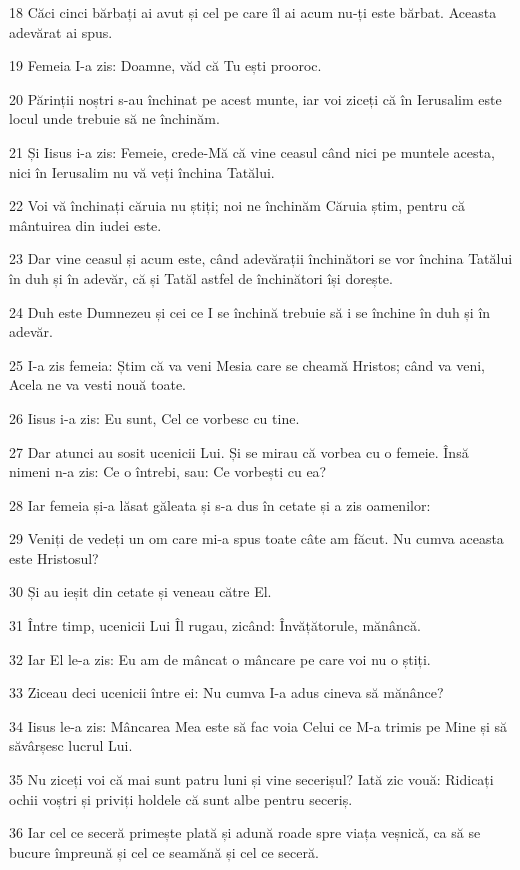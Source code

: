 \par 18 Căci cinci bărbați ai avut și cel pe care îl ai acum nu-ți este bărbat. Aceasta adevărat ai spus.
\par 19 Femeia I-a zis: Doamne, văd că Tu ești prooroc.
\par 20 Părinții noștri s-au închinat pe acest munte, iar voi ziceți că în Ierusalim este locul unde trebuie să ne închinăm.
\par 21 Și Iisus i-a zis: Femeie, crede-Mă că vine ceasul când nici pe muntele acesta, nici în Ierusalim nu vă veți închina Tatălui.
\par 22 Voi vă închinați căruia nu știți; noi ne închinăm Căruia știm, pentru că mântuirea din iudei este.
\par 23 Dar vine ceasul și acum este, când adevărații închinători se vor închina Tatălui în duh și în adevăr, că și Tatăl astfel de închinători își dorește.
\par 24 Duh este Dumnezeu și cei ce I se închină trebuie să i se închine în duh și în adevăr.
\par 25 I-a zis femeia: Știm că va veni Mesia care se cheamă Hristos; când va veni, Acela ne va vesti nouă toate.
\par 26 Iisus i-a zis: Eu sunt, Cel ce vorbesc cu tine.
\par 27 Dar atunci au sosit ucenicii Lui. Și se mirau că vorbea cu o femeie. Însă nimeni n-a zis: Ce o întrebi, sau: Ce vorbești cu ea?
\par 28 Iar femeia și-a lăsat găleata și s-a dus în cetate și a zis oamenilor:
\par 29 Veniți de vedeți un om care mi-a spus toate câte am făcut. Nu cumva aceasta este Hristosul?
\par 30 Și au ieșit din cetate și veneau către El.
\par 31 Între timp, ucenicii Lui Îl rugau, zicând: Învățătorule, mănâncă.
\par 32 Iar El le-a zis: Eu am de mâncat o mâncare pe care voi nu o știți.
\par 33 Ziceau deci ucenicii între ei: Nu cumva I-a adus cineva să mănânce?
\par 34 Iisus le-a zis: Mâncarea Mea este să fac voia Celui ce M-a trimis pe Mine și să săvârșesc lucrul Lui.
\par 35 Nu ziceți voi că mai sunt patru luni și vine secerișul? Iată zic vouă: Ridicați ochii voștri și priviți holdele că sunt albe pentru seceriș.
\par 36 Iar cel ce seceră primește plată și adună roade spre viața veșnică, ca să se bucure împreună și cel ce seamănă și cel ce seceră.
